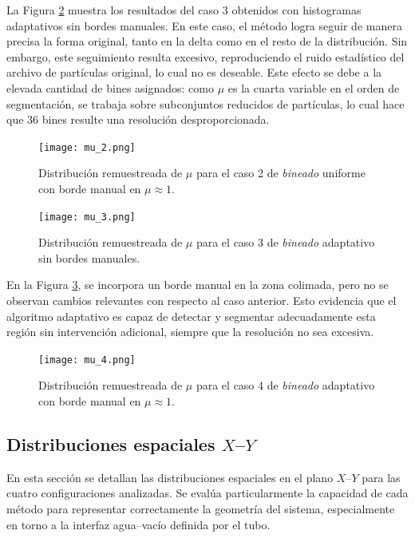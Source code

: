 La Figura \ref{fig:mu_3} muestra los resultados del caso 3 obtenidos con histogramas adaptativos sin bordes manuales. En este caso, el método logra seguir de manera precisa la forma original, tanto en la delta como en el resto de la distribución. Sin embargo, este seguimiento resulta excesivo, reproduciendo el ruido estadístico del archivo de partículas original, lo cual no es deseable. Este efecto se debe a la elevada cantidad de bines asignados: como $\mu$ es la cuarta variable en el orden de segmentación, se trabaja sobre subconjuntos reducidos de partículas, lo cual hace que 36 bines resulte una resolución desproporcionada.

\begin{figure}[H]
    \centering
    \texttt{[image: mu\_2.png]}
    \caption{Distribución remuestreada de $\mu$ para el caso 2 de \textit{bineado} uniforme con borde manual en $\mu \approx 1$.}
    \label{fig:mu_2}
\end{figure}

\begin{figure}[H]
    \centering
    \texttt{[image: mu\_3.png]}
    \caption{Distribución remuestreada de $\mu$ para el caso 3 de \textit{bineado} adaptativo sin bordes manuales.}
    \label{fig:mu_3}
\end{figure}

En la Figura \ref{fig:mu_4}, se incorpora un borde manual en la zona colimada, pero no se observan cambios relevantes con respecto al caso anterior. Esto evidencia que el algoritmo adaptativo es capaz de detectar y segmentar adecuadamente esta región sin intervención adicional, siempre que la resolución no sea excesiva.

\begin{figure}[H]
    \centering
    \texttt{[image: mu\_4.png]}
    \caption{Distribución remuestreada de $\mu$ para el caso 4 de \textit{bineado} adaptativo con borde manual en $\mu \approx 1$.}
    \label{fig:mu_4}
\end{figure}

\subsection{Distribuciones espaciales $X$–$Y$}

En esta sección se detallan las distribuciones espaciales en el plano $X$–$Y$ para las cuatro configuraciones analizadas. Se evalúa particularmente la capacidad de cada método para representar correctamente la geometría del sistema, especialmente en torno a la interfaz agua–vacío definida por el tubo.
    
